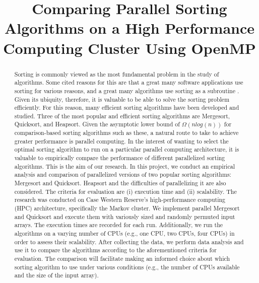 \documentclass[conference]{IEEEtran}
\begin{document}
		\title{Comparing Parallel Sorting Algorithms on a High Performance Computing Cluster Using OpenMP}
			\author{
			\and
			\and
			\and
			}
	\maketitle
	
\begin{abstract}
Sorting is commonly viewed as the most fundamental problem in the study of algorithms. Some cited reasons for this are that a great many software applications use sorting for various reasons, and a great many algorithms use sorting as a subroutine \cite{cormen_introduction_2009}. 
Given its ubiquity, therefore, it is valuable to be able to solve the sorting problem efficiently. 
For this reason, many efficient sorting algorithms have been developed and studied. Three of the most popular and efficient sorting algorithms are Mergesort, Quicksort,  and Heapsort. 
Given the asymptotic lower bound of $\Omega(nlog(n))$ for comparison-based sorting algorithms such as these, a natural route to take to achieve greater performance is parallel computing. 
In the interest of wanting to select the optimal sorting algorithm to run on a particular parallel computing architecture, it is valuable to empirically compare the performance of different parallelized sorting algorithms. 
This is the aim of our research. 
In this project, we conduct an empirical analysis and comparison of parallelized versions of two popular sorting algorithms: Mergesort and Quicksort. Heapsort and the difficulties of parallelizing it are also considered. 
The criteria for evaluation are (i) execution time and (ii) scalability. 
The research was conducted on Case Western Reserve’s high-performance computing (HPC) architecture, specifically the Markov cluster. 
We implement parallel Mergesort and Quicksort and execute them with variously sized and randomly permuted input arrays. The execution times are recorded for each run. 
Additionally, we run the algorithms on a varying number of CPUs (e.g., one CPU, two CPUs, four CPUs) in order to assess their scalability.
After collecting the data, we perform data analysis and use it to compare the algorithms according to the aforementioned criteria for evaluation. 
The comparison will facilitate making an informed choice about which sorting algorithm to use under various conditions (e.g., the number of CPUs available and the size of the input array).
\end{abstract}
\end{document}
